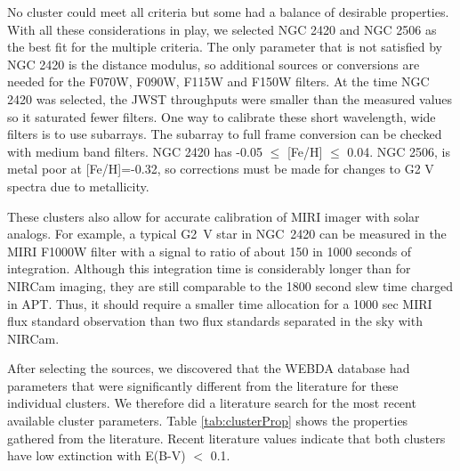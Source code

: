 \documentclass{aastex6}
\begin{document}
No cluster could meet all criteria but some had a balance of desirable properties.
With all these considerations in play, we selected NGC 2420 and NGC 2506 as the best fit for the multiple criteria.
The only parameter that is not satisfied by NGC 2420 is the distance modulus, so additional sources or conversions are needed for the F070W, F090W, F115W and F150W filters.
At the time NGC 2420 was selected, the JWST throughputs were smaller than the measured values so it saturated fewer filters.
One way to calibrate these short wavelength, wide filters is to use subarrays.
The subarray to full frame conversion can be checked with medium band filters.
NGC 2420 has -0.05 $\le$ [Fe/H] $\le$ 0.04.
NGC 2506, is metal poor at [Fe/H]=-0.32, so corrections must be made for changes to G2 V spectra due to metallicity.


These clusters also allow for accurate calibration of MIRI imager with solar analogs.
For example, a typical G2~V star in NGC~2420 can be measured in the MIRI F1000W filter with a signal to ratio of about 150 in 1000 seconds of integration.
Although this integration time is considerably longer than for NIRCam imaging, they are still comparable to the 1800 second slew time charged in APT.
Thus, it should require a smaller time allocation for a 1000 sec MIRI flux standard observation than two flux standards separated in the sky with NIRCam.

After selecting the sources, we discovered that the WEBDA database had parameters that were significantly different from the literature for these individual clusters.
We therefore did a literature search for the most recent available cluster parameters.
Table \ref{tab:clusterProp} shows the properties gathered from the literature.
Recent literature values indicate that both clusters have low extinction with E(B-V) $<$ 0.1.
\end{document}
